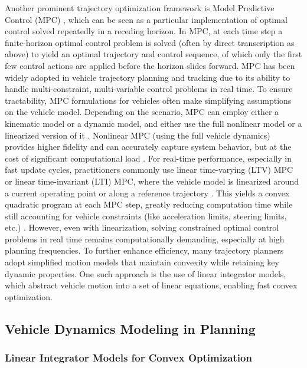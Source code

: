 Another prominent trajectory optimization framework is Model Predictive Control (MPC) \cite{falcone_predictive_2007,gray_robust_2013}, which can be
seen as a particular implementation of optimal control solved repeatedly in a receding horizon.
In MPC, at each time step a finite-horizon optimal control problem is solved (often by direct transcription as above) to yield an optimal trajectory
and control sequence, of which only the first few control actions are applied before the horizon slides forward.
MPC has been widely adopted in vehicle trajectory planning and tracking due to its ability to handle multi-constraint, multi-variable control
problems in real time.
To ensure tractability, MPC formulations for vehicles often make simplifying assumptions on the vehicle model.
Depending on the scenario, MPC can employ either a kinematic model or a dynamic model, and either use the full nonlinear model or a linearized
version of it \cite{xia_survey_2024}.
Nonlinear MPC (using the full vehicle dynamics) provides higher fidelity and can accurately capture system behavior, but at the cost of significant
computational load \cite{xia_survey_2024}.
For real-time performance, especially in fast update cycles, practitioners commonly use linear time-varying (LTV) MPC or linear time-invariant (LTI)
MPC, where the vehicle model is linearized around a current operating point or along a reference trajectory \cite{xia_survey_2024}.
This yields a convex quadratic program at each MPC step, greatly reducing computation time while still accounting for vehicle constraints (like
acceleration limits, steering limits, etc.)
\cite{xia_survey_2024}.
However, even with linearization, solving constrained optimal control problems in real time remains computationally demanding, especially at high
planning frequencies.
To further enhance efficiency, many trajectory planners adopt simplified motion models that maintain convexity while retaining key dynamic
properties.
One such approach is the use of linear integrator models, which abstract vehicle motion into a set of linear equations, enabling fast convex
optimization.

\subsection{Vehicle Dynamics Modeling in Planning}

\subsubsection{Linear Integrator Models for Convex Optimization}

